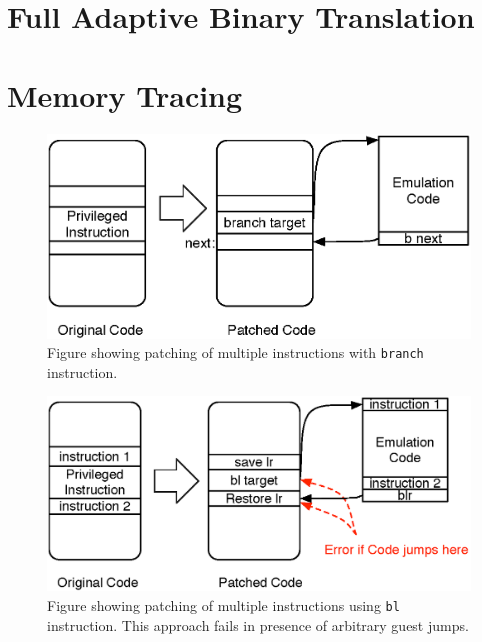 \section{Full Adaptive Binary Translation}
\label{full_binary_translation}

\section{Memory Tracing}
\label{memory_tracing}

\begin{figure}[!htb]
\centering

\includegraphics[scale=0.5]{txcache.eps}
\caption{\label{fig:txcache}Figure showing patching of multiple instructions with {\tt branch} instruction.}
\end{figure}

\begin{figure}[!htb]
\centering
\includegraphics[scale=0.5]{multiple_ins_patching.eps}
\caption{\label{fig:multiple_insns_patching}Figure showing patching of multiple instructions using {\tt bl} instruction. This approach fails in presence of arbitrary guest jumps.}
\end{figure}

